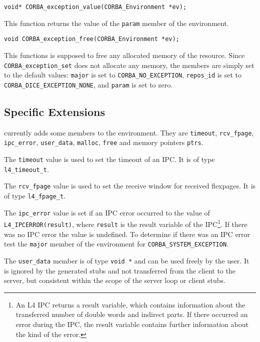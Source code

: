\begin{verbatim}
void* CORBA_exception_value(CORBA_Environment *ev);
\end{verbatim}

This function returns the value of the \verb|param| member of
the environment.

\begin{verbatim}
void CORBA_exception_free(CORBA_Environment *ev);
\end{verbatim}

This functions is supposed to free any allocated memory of
the resource. Since \verb|CORBA_exception_set| does not
allocate any memory, the members are simply set to the default
values: \verb|major| is set to \verb|CORBA_NO_EXCEPTION|,
\verb|repos_id| is set to \verb|CORBA_DICE_EXCEPTION_NONE|,
and \verb|param| is set to zero.

\subsection{\dice{} Specific Extensions}
\label{sec:env-dice}

\dice{} currently adds some members to the environment.
They are \verb|timeout|, \verb|rcv_fpage|, \verb|ipc_error|,
\verb|user_data|, \verb|malloc|, \verb|free| and memory
pointers \verb|ptrs|.

The \verb|timeout| value is used to set the timeout
of an IPC. It is of type \verb|l4_timeout_t|.

The \verb|rcv_fpage| value is used to set the receive
window for received flexpages. It is of type
\verb|l4_fpage_t|.

The \verb|ipc_error| value is set if an IPC error
occurred to the value of \verb|L4_IPCERROR(result)|,
where \verb|result| is the result variable of the
IPC\footnote{An L4 IPC returns a result variable,
which contains information about the transferred number
of double words and indirect parts. If there occurred an
error during the IPC, the result variable contains
further information about the kind of the error.}. 
If there was no IPC error the value is undefined.
To determine if there was an IPC error test the
\verb|major| member of the environment for
\verb|CORBA_SYSTEM_EXCEPTION|.

The \verb|user_data| member is of type \verb|void *| and
can be used freely by the user. It is ignored by the generated
stubs and not transferred from the client to the server,
but consistent within the scope of the server loop or
client stubs.

